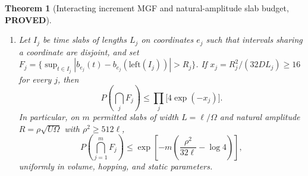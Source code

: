 \documentclass[11pt]{article}
\newtheorem{theorem}{Theorem}
\theoremstyle{remark}
\newcommand{\proved}{\textbf{PROVED}}
\begin{document}
\begin{theorem}[Interacting increment MGF and natural-amplitude slab budget, \proved]
\begin{enumerate}
\item[(c)] Let $I_j$ be time slabs of lengths $L_j$ on coordinates $e_j$ such that intervals sharing a coordinate are disjoint, and set $F_j=\{\sup_{t\in I_j}|b_{e_j}(t)-b_{e_j}(\mathrm{left}(I_j))|>R_j\}$. If $x_j=R_j^2/(32DL_j)\ge 16$ for every $j$, then
\begin{equation}\label{eq:slab-budget}
 P\!\left(\bigcap_j F_j\right)\le \prod_j \bigl[4\exp(-x_j)\bigr].
\end{equation}
In particular, on $m$ permitted slabs of width $L=\ell/\Omega$ and natural amplitude $R=\rho\sqrt{U\Omega}$ with $\rho^2\ge 512\ell$,
\begin{equation}\label{eq:natural-slab}
 P\!\left(\bigcap_{j=1}^m F_j\right)\le \exp\!\left[-m\left(\frac{\rho^2}{32\ell}-\log 4\right)\right],
\end{equation}
uniformly in volume, hopping, and static parameters.
\end{enumerate}
\end{theorem}
\end{document}
